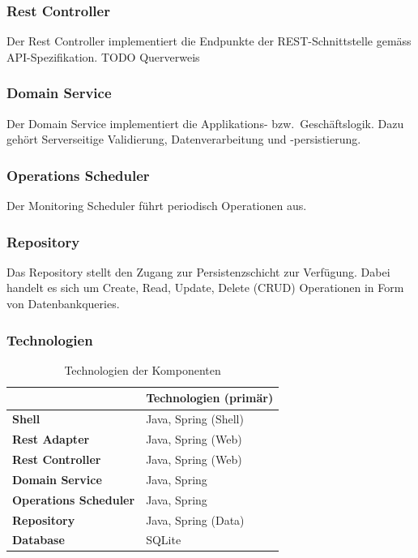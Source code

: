 \documentclass[a4paper,12pt]{report}
\begin{document}
    \subsubsection{Rest Controller}
    Der Rest Controller implementiert die Endpunkte der REST-Schnittstelle gemäss API-Spezifikation. TODO Querverweis

    \subsubsection{Domain Service}
    Der Domain Service implementiert die Applikations- bzw.\ Geschäftslogik.
    Dazu gehört Serverseitige Validierung, Datenverarbeitung und -persistierung.

    \subsubsection{Operations Scheduler}
    Der Monitoring Scheduler führt periodisch Operationen aus.

    \subsubsection{Repository}
    Das Repository stellt den Zugang zur Persistenzschicht zur Verfügung.
    Dabei handelt es sich um Create, Read, Update, Delete (CRUD) Operationen in Form von Datenbankqueries.

    \subsubsection{Technologien}
    \begin{table}[h!]
        \centering
        \setlength{\leftmargini}{0.4cm}
        \begin{tabular}{|p{5.5cm}|p{5cm}|}
            \hline
            & \textbf{Technologien (primär)} \\
            \hline
            \textbf{Shell}                & Java, Spring (Shell)           \\
            \hline
            \textbf{Rest Adapter}         & Java, Spring (Web)             \\
            \hline
            \textbf{Rest Controller}      & Java, Spring (Web)             \\
            \hline
            \textbf{Domain Service}       & Java, Spring                   \\
            \hline
            \textbf{Operations Scheduler} & Java, Spring                   \\
            \hline
            \textbf{Repository}           & Java, Spring (Data)            \\
            \hline
            \textbf{Database}             & SQLite                         \\
            \hline
        \end{tabular}
        \caption{Technologien der Komponenten}\label{tab:table}
    \end{table}
\end{document}
